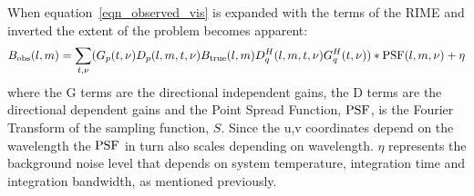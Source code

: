 When equation~\ref{eqn_observed_vis} is expanded with the terms of the RIME and inverted the extent of the problem becomes apparent:
\begin{equation}
 B_{\text{obs}}(l,m) = \sum_{t,\nu}(G_p(t,\nu)D_p(l,m,t,\nu)B_{\text{true}}(l,m)D_q^H(l,m,t,\nu)G_q^H(t,\nu))*\textrm{PSF}{(l,m,\nu)} + \eta
\end{equation}
where the G terms are the directional independent gains, the D terms are the directional dependent gains and the Point Spread Function, $\textrm{PSF}$, is the Fourier Transform of the sampling function, $S$. Since
the u,v coordinates depend on the wavelength the $\textrm{PSF}$ in turn also scales depending on wavelength. $\eta$ represents the background noise level that depends on system temperature, integration time and integration
bandwidth, as mentioned previously.

